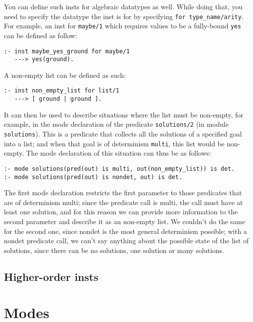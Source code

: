 You can define such insts for algebraic datatypes as well. While doing that, you need to specify the datatype the inst is for by specifying \texttt{for type_name/arity}. For example, an inst for \texttt{maybe/1} which requires values to be a fully-bound \texttt{yes} can be defined as follow:

\begin{lstlisting}[language=Mercury]
:- inst maybe_yes_ground for maybe/1
   ---> yes(ground).
\end{lstlisting}

A non-empty list can be defined as such:

\begin{lstlisting}[language=Mercury]
:- inst non_empty_list for list/1
   ---> [ ground | ground ].
\end{lstlisting}

It can then be used to describe situations where the list must be non-empty, for example, in the mode declaration of the predicate \texttt{solutions/2} (in module \texttt{solutions}). This is a predicate that collects all the solutions of a specified goal into a list; and when that goal is of determinism \texttt{multi}, this list would be non-empty. The mode declaration of this situation can thus be as follows:

\begin{lstlisting}[language=Mercury]
:- mode solutions(pred(out) is multi, out(non_empty_list)) is det.
:- mode solutions(pred(out) is nondet, out) is det.
\end{lstlisting}

The first mode declaration restricts the first parameter to those predicates that are of determinism multi; since the predicate call is multi, the call must have at least one solution, and for this reason we can provide more information to the second parameter and describe it as an non-empty list. We couldn't do the same for the second one, since nondet is the most general determinism possible; with a nondet predicate call, we can't say anything about the possible state of the list of solutions, since there can be no solutions, one solution or many solutions.

\subsection{Higher-order insts}

\section{Modes}

